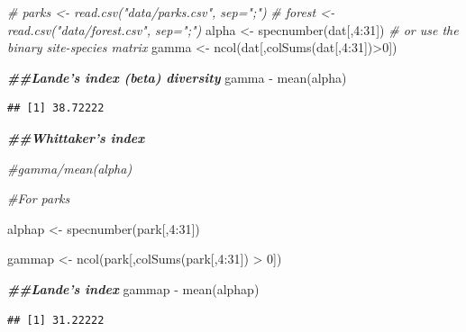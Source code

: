 \documentclass[
]{article}
\newenvironment{Shaded}{\begin{snugshade}}{\end{snugshade}}
\newcommand{\CommentTok}[1]{\textcolor[rgb]{0.56,0.35,0.01}{\textit{#1}}}
\newcommand{\DecValTok}[1]{\textcolor[rgb]{0.00,0.00,0.81}{#1}}
\newcommand{\DocumentationTok}[1]{\textcolor[rgb]{0.56,0.35,0.01}{\textbf{\textit{#1}}}}
\newcommand{\FunctionTok}[1]{\textcolor[rgb]{0.00,0.00,0.00}{#1}}
\newcommand{\NormalTok}[1]{#1}
\newcommand{\OtherTok}[1]{\textcolor[rgb]{0.56,0.35,0.01}{#1}}
\newcommand{\SpecialCharTok}[1]{\textcolor[rgb]{0.00,0.00,0.00}{#1}}
\begin{document}
\begin{Shaded}
\begin{Highlighting}[]
\CommentTok{\# parks \textless{}{-} read.csv("data/parks.csv", sep=";")}
\CommentTok{\# forest \textless{}{-} read.csv("data/forest.csv", sep=";")}
\NormalTok{alpha }\OtherTok{\textless{}{-}} \FunctionTok{specnumber}\NormalTok{(dat[,}\DecValTok{4}\SpecialCharTok{:}\DecValTok{31}\NormalTok{]) }\CommentTok{\# or use the binary site{-}species matrix}
\NormalTok{gamma }\OtherTok{\textless{}{-}} \FunctionTok{ncol}\NormalTok{(dat[,}\FunctionTok{colSums}\NormalTok{(dat[,}\DecValTok{4}\SpecialCharTok{:}\DecValTok{31}\NormalTok{])}\SpecialCharTok{\textgreater{}}\DecValTok{0}\NormalTok{])}

\DocumentationTok{\#\#Lande’s index  (beta) diversity}
\NormalTok{gamma }\SpecialCharTok{{-}} \FunctionTok{mean}\NormalTok{(alpha)}
\end{Highlighting}
\end{Shaded}

\begin{verbatim}
## [1] 38.72222
\end{verbatim}

\begin{Shaded}
\begin{Highlighting}[]
\DocumentationTok{\#\#Whittaker’s index}

\CommentTok{\#gamma/mean(alpha)}


\CommentTok{\#For parks}

\NormalTok{alphap }\OtherTok{\textless{}{-}} \FunctionTok{specnumber}\NormalTok{(park[,}\DecValTok{4}\SpecialCharTok{:}\DecValTok{31}\NormalTok{])}

\NormalTok{gammap }\OtherTok{\textless{}{-}} \FunctionTok{ncol}\NormalTok{(park[,}\FunctionTok{colSums}\NormalTok{(park[,}\DecValTok{4}\SpecialCharTok{:}\DecValTok{31}\NormalTok{]) }\SpecialCharTok{\textgreater{}} \DecValTok{0}\NormalTok{])}

\DocumentationTok{\#\#Lande’s index }
\NormalTok{gammap }\SpecialCharTok{{-}} \FunctionTok{mean}\NormalTok{(alphap)}
\end{Highlighting}
\end{Shaded}

\begin{verbatim}
## [1] 31.22222
\end{verbatim}
\end{document}

